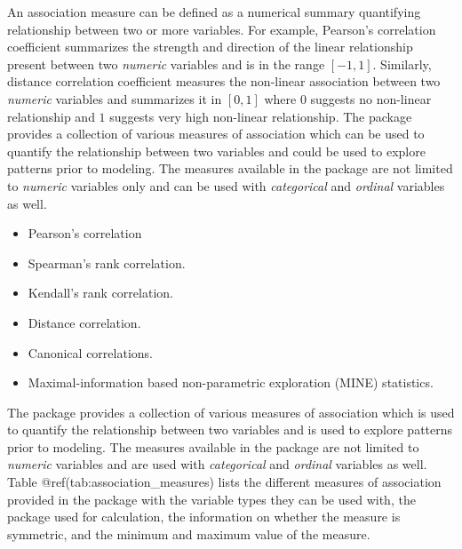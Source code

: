 An association measure can be defined as a numerical summary quantifying
relationship between two or more variables. For example, Pearson's
correlation coefficient summarizes the strength and direction of the
linear relationship present between two \emph{numeric} variables and is
in the range \([-1,1]\). Similarly, distance correlation coefficient
measures the non-linear association between two \emph{numeric} variables
and summarizes it in \([0,1]\) where \(0\) suggests no non-linear
relationship and \(1\) suggests very high non-linear relationship. The
package provides a collection of various measures of association which
can be used to quantify the relationship between two variables and could
be used to explore patterns prior to modeling. The measures available in
the package are not limited to \emph{numeric} variables only and can be
used with \emph{categorical} and \emph{ordinal} variables as well.

\begin{itemize}
\item Pearson's correlation
\item Spearman's rank correlation.
\item Kendall's rank correlation.
\item Distance correlation.
\item Canonical correlations.
\item Maximal-information based non-parametric exploration (MINE) statistics.
\end{itemize}

The package provides a collection of various measures of association
which is used to quantify the relationship between two variables and is
used to explore patterns prior to modeling. The measures available in
the package are not limited to \emph{numeric} variables and are used
with \emph{categorical} and \emph{ordinal} variables as well. Table
@ref(tab:association\_measures) lists the different measures of
association provided in the package with the variable types they can be
used with, the package used for calculation, the information on whether
the measure is symmetric, and the minimum and maximum value of the
measure.

